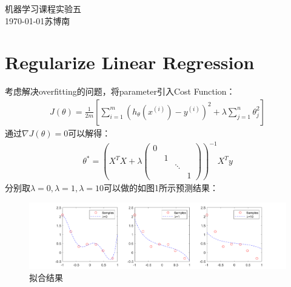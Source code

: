 \documentclass{article}
\begin{document}
\begin{center}
    \huge{机器学习课程实验五}\\
    \large{\today \quad 苏博南}
\end{center}

\section{Regularize Linear Regression}

考虑解决overfitting的问题，将parameter引入Cost Function：
\begin{equation}
    \begin{split}
        J(\theta)=\frac{1}{2m}[\sum_{i=1}^m(h_\theta(x^{(i)})-y^{(i)})^2+\lambda\sum_{j=1}^n\theta_j^2]
    \end{split} 
\end{equation}
通过$\nabla J(\theta)=0$可以解得：
\begin{equation}
    \begin{split}
        \theta^*=(X^TX+\lambda\begin{pmatrix}0 & & & \\ & 1 & & \\ & & \ddots & \\ & & & 1\end{pmatrix})^{-1}X^Ty
    \end{split}
\end{equation}
分别取$\lambda=0,\lambda=1,\lambda=10$可以做的如图1所示预测结果：
\begin{figure}[h]
    \centering
    \includegraphics[width=\linewidth]{1.png}
    \caption{拟合结果}
\end{figure}
\end{document}
